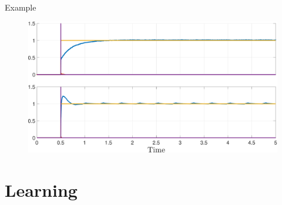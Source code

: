 \documentclass[17pt, t, lualatex]{beamer}
\begin{document}
\begin{frame}{Example}

	\begin{figure}
		\centering
		\includegraphics[scale = 0.45]{figures/plots/Control/compare_step_both_methods.pdf}
	\end{figure}
\end{frame}


\section{Learning}\insertsectionpage
\end{document}
